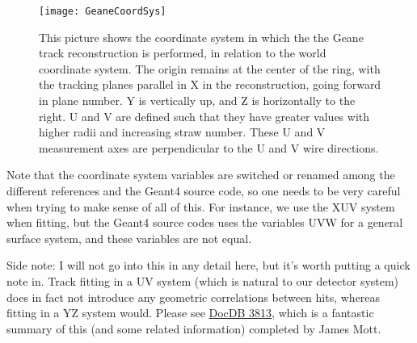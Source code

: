 	\begin{figure}[]
		\caption{This picture shows the coordinate system in which the the Geane track reconstruction is performed, in relation to the world coordinate system. The origin remains at the center of the ring, with the tracking planes parallel in X in the reconstruction, going forward in plane number. Y is vertically up, and Z is horizontally to the right. U and V are defined such that they have greater values with higher radii and increasing straw number. These U and V measurement axes are perpendicular to the U and V wire directions.}
	\centering
	\texttt{[image: GeaneCoordSys]}
	\label{fig:GeaneCoordSys}
	\end{figure}

	
	Note that the coordinate system variables are switched or renamed among the different references and the Geant4 source code, so one needs to be very careful when trying to make sense of all of this. For instance, we use the XUV system when fitting, but the Geant4 source codes uses the variables UVW for a general surface system, and these variables are not equal. 

	Side note: I will not go into this in any detail here, but it's worth putting a quick note in. Track fitting in a UV system (which is natural to our detector system) does in fact not introduce any geometric correlations between hits, whereas fitting in a YZ system would. Please see \href{http://gm2-docdb.fnal.gov:8080/cgi-bin/ShowDocument?docid=3813}{DocDB 3813}, which is a fantastic summary of this (and some related information) completed by James Mott.

